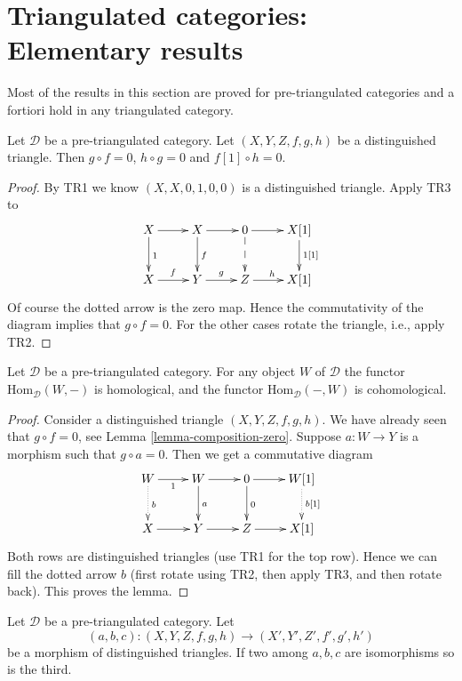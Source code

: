 \section{Triangulated categories: Elementary results}
\label{section-elementary-results}

\noindent
Most of the results in this section are proved for pre-triangulated categories
and a fortiori hold in any triangulated category.

\begin{lemma}
\label{lemma-composition-zero}
Let $\mathcal{D}$ be a pre-triangulated category.
Let $(X, Y, Z, f, g, h)$ be a distinguished triangle.
Then $g \circ f = 0$,
$h \circ g = 0$ and $f[1] \circ h = 0$.
\end{lemma}

\begin{proof}
By TR1 we know $(X, X, 0, 1, 0, 0)$ is a distinguished triangle.
Apply TR3 to
$$
\xymatrix{
X \ar[r] \ar[d]^1 &
X \ar[r] \ar[d]^f &
0 \ar[r] \ar@{-->}[d] &
X[1] \ar[d]^{1[1]} \\
X \ar[r]^f &
Y \ar[r]^g &
Z \ar[r]^h &
X[1]
}
$$
Of course the dotted arrow is the zero map. Hence the commutativity of
the diagram implies that $g \circ f = 0$. For the other cases
rotate the triangle, i.e., apply TR2.
\end{proof}

\begin{lemma}
\label{lemma-representable-homological}
Let $\mathcal{D}$ be a pre-triangulated category.
For any object $W$ of $\mathcal{D}$ the functor
$\text{Hom}_{\mathcal{D}}(W, -)$ is homological, and the functor
$\text{Hom}_{\mathcal{D}}(-, W)$ is cohomological.
\end{lemma}

\begin{proof}
Consider a distinguished triangle $(X, Y, Z, f, g, h)$.
We have already seen that $g \circ f = 0$, see
Lemma \ref{lemma-composition-zero}.
Suppose $a : W \to Y$ is a morphism such that $g \circ a = 0$.
Then we get a commutative diagram
$$
\xymatrix{
W \ar[r]_1 \ar@{..>}[d]^b &
W \ar[r] \ar[d]^a &
0 \ar[r] \ar[d]^0 &
W[1] \ar@{..>}[d]^{b[1]} \\
X \ar[r] & Y \ar[r] & Z \ar[r] & X[1]
}
$$
Both rows are distinguished triangles (use TR1 for the top row).
Hence we can fill the dotted arrow $b$ (first rotate using TR2,
then apply TR3, and then rotate back). This proves the lemma.
\end{proof}

\begin{lemma}
\label{lemma-third-isomorphism-triangle}
Let $\mathcal{D}$ be a pre-triangulated category.
Let
$$
(a, b, c) : (X, Y, Z, f, g, h) \to (X', Y', Z', f', g', h')
$$
be a morphism of distinguished triangles. If two among $a, b, c$
are isomorphisms so is the third.
\end{lemma}

